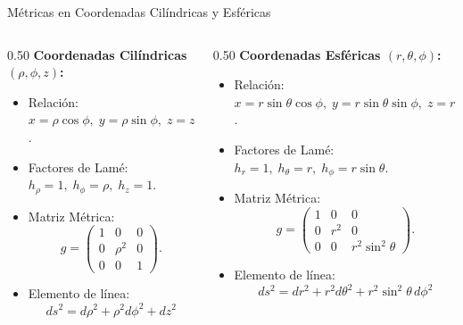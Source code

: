 \documentclass[10pt,aspectratio=169]{beamer}
\begin{document}
\begin{frame}{Métricas en Coordenadas Cilíndricas y Esféricas}
  \begin{columns}[c]
    \begin{column}{0.50\textwidth}
      \footnotesize
      \textbf{Coordenadas Cilíndricas $(\rho, \phi, z)$:}
      \begin{itemize}\scriptsize\itemsep2pt
        \item Relación: $x = \rho\cos\phi, \; y = \rho\sin\phi, \; z = z$.
        \item Factores de Lamé: $h_\rho = 1, \; h_\phi = \rho, \; h_z = 1$.
        \item Matriz Métrica:
        \[
        g = \begin{pmatrix} 1 & 0 & 0 \\ 0 & \rho^2 & 0 \\ 0 & 0 & 1 \end{pmatrix}.
        \]
        \item Elemento de línea:
        \[
        \boxed{ds^2 = d\rho^2 + \rho^2 d\phi^2 + dz^2}
        \]
      \end{itemize}
    \end{column}
    \begin{column}{0.50\textwidth}
      \footnotesize
      \textbf{Coordenadas Esféricas $(r, \theta, \phi)$:}
      \begin{itemize}\scriptsize\itemsep2pt
        \item Relación:
        $x = r\sin\theta\cos\phi, \; y = r\sin\theta\sin\phi, \; z = r\cos\theta$.
        \item Factores de Lamé:
        $h_r = 1, \; h_\theta = r, \; h_\phi = r\sin\theta$.
        \item Matriz Métrica:
        \[
        g = \begin{pmatrix} 1 & 0 & 0 \\ 0 & r^2 & 0 \\ 0 & 0 & r^2\sin^2\theta \end{pmatrix}.
        \]
        \item Elemento de línea:
        \[
        \boxed{ds^2 = dr^2 + r^2 d\theta^2 + r^2\sin^2\theta\, d\phi^2}
        \]
      \end{itemize}
    \end{column}
  \end{columns}
\end{frame}
\end{document}
